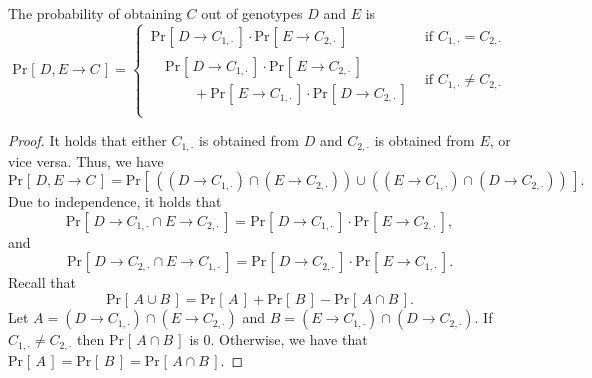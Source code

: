 \documentclass[runningheads]{llncs}
\renewcommand{\Pr}[2][]{\mathrm{Pr}_{#1} [\, #2 \, ]}
\begin{document}
\begin{lemma}
\label{lem:probability}
The probability of obtaining $C$ out of genotypes $D$ and $E$ is
\begin{equation}
\label{eq:combined_prob}
\Pr{D, E \rightarrow C} =
\begin{cases}
  \, \Pr{D \rightarrow C_{1,\cdot}} \cdot \Pr{E \rightarrow C_{2,\cdot}} & \mbox{if $C_{1,\cdot} = C_{2,\cdot}$}\\
  \begin{aligned}
    &  \Pr{D \rightarrow C_{1,\cdot}} \cdot \Pr{E \rightarrow C_{2,\cdot}}\\
    &  \quad \quad + \Pr{E \rightarrow C_{1,\cdot}} \cdot \Pr{D \rightarrow C_{2,\cdot}}
  \end{aligned} & \mbox{if $C_{1,\cdot} \neq C_{2,\cdot}$}\\
\end{cases}
\end{equation}
\end{lemma}

\begin{proof}
It holds that either $C_{1,\cdot}$ is obtained from $D$ and $C_{2,\cdot}$ is obtained from $E$,
or vice versa. Thus, we have
\begin{equation*}
\Pr{D, E \rightarrow C} = \Pr{((D \rightarrow C_{1,\cdot}) \cap (E \rightarrow C_{2,\cdot})) \cup ((E \rightarrow C_{1,\cdot}) \cap (D \rightarrow C_{2,\cdot}))}.
\end{equation*}
Due to independence, it holds that
\begin{equation*}
\Pr{D \rightarrow C_{1,\cdot} \cap E \rightarrow C_{2,\cdot}} = \Pr{D \rightarrow C_{1,\cdot}} \cdot \Pr{E \rightarrow C_{2,\cdot}},
\end{equation*}
and
\begin{equation*}
\Pr{D \rightarrow C_{2,\cdot} \cap E \rightarrow C_{1,\cdot}} = \Pr{D \rightarrow C_{2,\cdot}} \cdot \Pr{E \rightarrow C_{1,\cdot}}.
\end{equation*}
Recall that %
\begin{equation*}
\Pr{A \cup B} = \Pr{A}+ \Pr{B} - \Pr{A \cap B}.
\end{equation*}
Let $A = (D \rightarrow C_{1,\cdot}) \cap (E \rightarrow C_{2,\cdot})$ and $B = (E \rightarrow
C_{1,\cdot}) \cap (D \rightarrow C_{2,\cdot})$. If $C_{1,\cdot} \neq C_{2,\cdot}$ then $\Pr{A \cap B}$ is 0.
Otherwise, we have that $\Pr{A} = \Pr{B} = \Pr{A \cap B}$. 
\end{proof}
\end{document}
